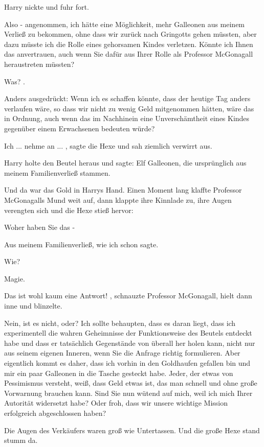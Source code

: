 Harry nickte und fuhr fort.

\glqq Also - angenommen, ich hätte eine Möglichkeit, mehr Galleonen aus meinem
Verließ zu bekommen, ohne dass wir zurück nach Gringotts gehen müssten, aber
dazu müsste ich die Rolle eines gehorsamen Kindes verletzen. Könnte ich
Ihnen das anvertrauen, auch wenn Sie dafür aus Ihrer Rolle als Professor
McGonagall heraustreten müssten?\grqq{}

\glqq Was?\grqq{} .

\glqq Anders ausgedrückt: Wenn ich es schaffen könnte, dass der heutige Tag
anders verlaufen wäre, so dass wir nicht zu wenig Geld mitgenommen hätten,
wäre das in Ordnung, auch wenn das im Nachhinein eine Unverschämtheit eines
Kindes gegenüber einem Erwachsenen bedeuten würde?\grqq{}

\glqq Ich ... nehme an ...\grqq{} , sagte die Hexe und sah ziemlich verwirrt
aus.

Harry holte den Beutel heraus und sagte: \glqq Elf Galleonen, die ursprünglich
aus meinem Familienverließ stammen.\grqq{}

Und da war das Gold in Harrys Hand. Einen Moment lang klaffte Professor
McGonagalls Mund weit auf, dann klappte ihre Kinnlade zu, ihre Augen
verengten sich und die Hexe stieß hervor:

\glqq Woher haben Sie das -\grqq{}

\glqq Aus meinem Familienverließ, wie ich schon sagte.\grqq{}

\glqq Wie?\grqq{}

\glqq Magie.\grqq{}

\glqq Das ist wohl kaum eine Antwort!\grqq{} , schnauzte Professor McGonagall,
hielt dann inne und blinzelte.

\glqq Nein, ist es nicht, oder? Ich sollte behaupten, dass es daran liegt, dass
ich experimentell die wahren Geheimnisse der Funktionsweise des Beutels
entdeckt habe und dass er tatsächlich Gegenstände von überall her holen
kann, nicht nur aus seinem eigenen Inneren, wenn Sie die Anfrage richtig
formulieren. Aber eigentlich kommt es daher, dass ich vorhin in den
Goldhaufen gefallen bin und mir ein paar Galleonen in die Tasche gesteckt
habe. Jeder, der etwas von Pessimismus versteht, weiß, dass Geld etwas ist,
das man schnell und ohne große Vorwarnung brauchen kann. Sind Sie nun wütend
auf mich, weil ich mich Ihrer Autorität widersetzt habe? Oder froh, dass wir
unsere wichtige Mission erfolgreich abgeschlossen haben?\grqq{}

Die Augen des Verkäufers waren groß wie Untertassen. Und die große Hexe stand
stumm da.

